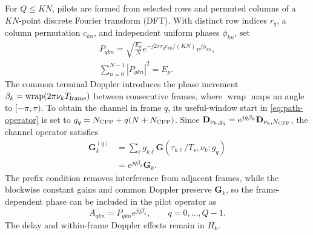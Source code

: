 For $Q\leq KN$, pilots are formed from selected rows and permuted columns
of a $KN$-point discrete Fourier transform (DFT). With distinct row indices
$r_q$, a column permutation $c_{kn}$, and independent uniform phases
$\phi_{kn}$, set
\begin{equation}
 \begin{gathered}
 P_{qkn}=\sqrt{\frac{E_p}{N}}
 e^{-j2\pi r_qc_{kn}/(KN)}e^{j\phi_{kn}},\\
 \sum_{n=0}^{N-1}|P_{qkn}|^2=E_p.
 \end{gathered}
 \label{eq:pilot}
\end{equation}
The common terminal Doppler introduces the phase increment
$\beta_k=\operatorname{wrap}(2\pi\nu_kT_{\rm frame})$ between consecutive
frames, where $\operatorname{wrap}$ maps an angle to $[-\pi,\pi)$.
To obtain the channel in frame $q$, its useful-window start in
\eqref{eq:path-operator} is set to
$g_q=N_{\rm CPP}+q(N+N_{\rm CPP})$. Since
$\mathbf D_{\nu_k,g_q}=e^{jq\beta_k}\mathbf D_{\nu_k,N_{\rm CPP}}$,
the channel operator satisfies
\begin{equation}
 \begin{aligned}
 \mathbf G_k^{(q)}
 &=\sum_\ell g_{k\ell}\mathbf G(\tau_{k\ell}/T_s,\nu_k;g_q)\\
 &=e^{jq\beta_k}\mathbf G_k.
 \end{aligned}
 \label{eq:twc-frame-channel}
\end{equation}
The prefix condition removes interference from adjacent frames, while
the blockwise constant gains and common Doppler preserve $\mathbf G_k$,
so the frame-dependent phase can be included in the pilot operator as
\begin{equation}
 A_{qkn}=P_{qkn}e^{jq\beta_k},\qquad q=0,\ldots,Q-1.
 \label{eq:effective-pilot}
\end{equation}
The delay and within-frame Doppler effects remain in $H_k$.


